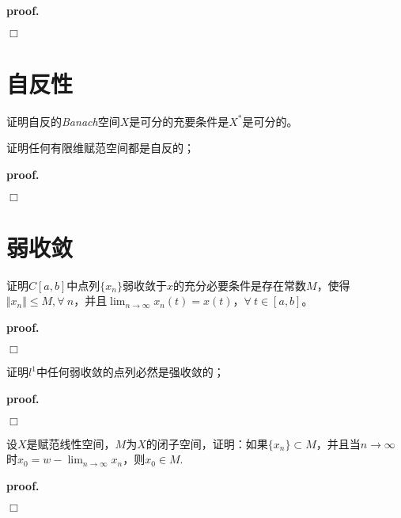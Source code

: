 \textbf{proof. }

$\Box$

\section{自反性}

\begin{mdframed}
    \begin{question}
        证明自反的\textsl{Banach}空间$X$是可分的充要条件是$X^*$是可分的。
    \end{question}
\end{mdframed}

\begin{mdframed}
    \begin{question}
        证明任何有限维赋范空间都是自反的；
    \end{question}
\end{mdframed}

\textbf{proof. }

$\Box$

\section{弱收敛}

\begin{mdframed}
    \begin{question}
        证明$C[a,b]$中点列$\{x_n\}$弱收敛于$x$的充分必要条件是存在常数$M$，使得$\Vert x_n\Vert\leqslant M,\forall\ n$，并且$\lim_{n\rightarrow \infty}x_n(t)=x(t)$，$\forall\ t\in [a,b]$。
    \end{question}
\end{mdframed}

\textbf{proof. }

$\Box$

\begin{mdframed}
    \begin{question}
        证明$l^1$中任何弱收敛的点列必然是强收敛的；
    \end{question}
\end{mdframed}

\textbf{proof. }

$\Box$

\begin{mdframed}
    \begin{question}
        设$X$是赋范线性空间，$M$为$X$的闭子空间，证明：如果$\{x_n\}\subset M$，并且当$n\rightarrow \infty$时$x_0=w-\lim_{n\rightarrow \infty}x_n$，则$x_0\in M$.
    \end{question}
\end{mdframed}

\textbf{proof. }

$\Box$
